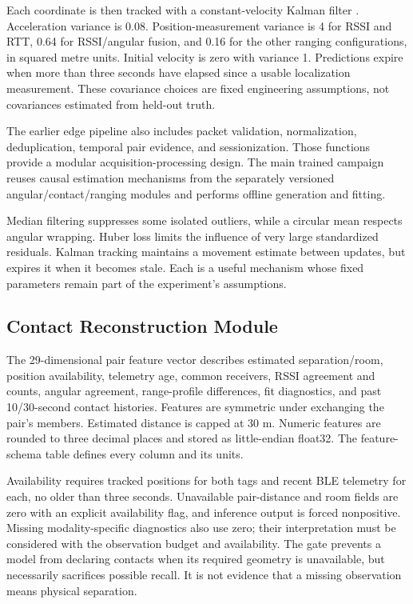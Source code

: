 \documentclass[12pt,a4paper]{report}
\begin{document}
Each coordinate is then tracked with a constant-velocity Kalman filter \cite{ref14}. Acceleration variance is 0.08. Position-measurement variance is 4 for RSSI and RTT, 0.64 for RSSI/angular fusion, and 0.16 for the other ranging configurations, in squared metre units. Initial velocity is zero with variance 1. Predictions expire when more than three seconds have elapsed since a usable localization measurement. These covariance choices are fixed engineering assumptions, not covariances estimated from held-out truth.

The earlier edge pipeline also includes packet validation, normalization, deduplication, temporal pair evidence, and sessionization. Those functions provide a modular acquisition-processing design. The main trained campaign reuses causal estimation mechanisms from the separately versioned angular/contact/ranging modules and performs offline generation and fitting.

Median filtering suppresses some isolated outliers, while a circular mean respects angular wrapping. Huber loss limits the influence of very large standardized residuals. Kalman tracking maintains a movement estimate between updates, but expires it when it becomes stale. Each is a useful mechanism whose fixed parameters remain part of the experiment's assumptions.

\subsection{Contact Reconstruction Module}
The 29-dimensional pair feature vector describes estimated separation/room, position availability, telemetry age, common receivers, RSSI agreement and counts, angular agreement, range-profile differences, fit diagnostics, and past 10/30-second contact histories. Features are symmetric under exchanging the pair's members. Estimated distance is capped at 30 m. Numeric features are rounded to three decimal places and stored as little-endian float32. The feature-schema table defines every column and its units.

Availability requires tracked positions for both tags and recent BLE telemetry for each, no older than three seconds. Unavailable pair-distance and room fields are zero with an explicit availability flag, and inference output is forced nonpositive. Missing modality-specific diagnostics also use zero; their interpretation must be considered with the observation budget and availability. The gate prevents a model from declaring contacts when its required geometry is unavailable, but necessarily sacrifices possible recall. It is not evidence that a missing observation means physical separation.
\end{document}
